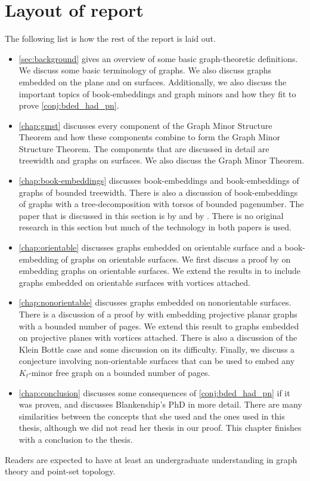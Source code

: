 \section{Layout of report}
The following list is how the rest of the report is laid out. 
\begin{itemize}
	\item \cref{sec:background} gives an overview of some basic graph-theoretic definitions. We discuss some basic terminology of graphs. We also discuss graphs embedded on the plane and on surfaces. Additionally, we also discuss the important topics of book-embeddings and graph minors and how they fit to prove \cref{conj:bded_had_pn}. 
	\item \cref{chap:gmst} discusses every component of the Graph Minor Structure Theorem and how these components combine to form the Graph Minor Structure Theorem. The components that are discussed in detail are treewidth and graphs on surfaces. We also discuss the Graph Minor Theorem. 
	\item \cref{chap:book-embeddings} discusses book-embeddings and book-embeddings of graphs of bounded treewidth. There is also a discussion of book-embeddings of graphs with a tree-decomposition with torsos of bounded pagenumber. The paper that is discussed in this section is by \textcite{hickingbothamStackNumberCliqueSum2023} and by \textcite{ganleyPagenumberTrees2001}. There is no original research in this section but much of the technology in both papers is used. 
	\item \cref{chap:orientable} discusses graphs embedded on orientable surface and a book-embedding of graphs on orientable surfaces. We first discuss a proof by \textcite{heathPagenumberGenusGraphs1992} on embedding graphs on orientable surfaces. We extend the results in \textcite{heathPagenumberGenusGraphs1992} to include graphs embedded on orientable surfaces with vortices attached. 
	\item \cref{chap:nonorientable} discusses graphs embedded on nonorientable surfaces. There is a discussion of a proof by \textcite{nakamotoBookEmbeddingProjectiveplanar2015} with embedding projective planar graphs with a bounded number of pages. We extend this result to graphs embedded on projective planes with vortices attached. There is also a discussion of the Klein Bottle case and some discussion on its difficulty. Finally, we discuss a conjecture involving non-orientable surfaces that can be used to embed any $K_t$-minor free graph on a bounded number of pages. 
	\item \cref{chap:conclusion} discusses some consequences of \cref{conj:bded_had_pn} if it was proven, and discusses Blankenship's PhD in more detail. There are many similarities between the concepts that she used and the ones used in this thesis, although we did not read her thesis in our proof. This chapter finishes with a conclusion to the thesis. 
\end{itemize}

Readers are expected to have at least an undergraduate understanding in graph theory and point-set topology. 
